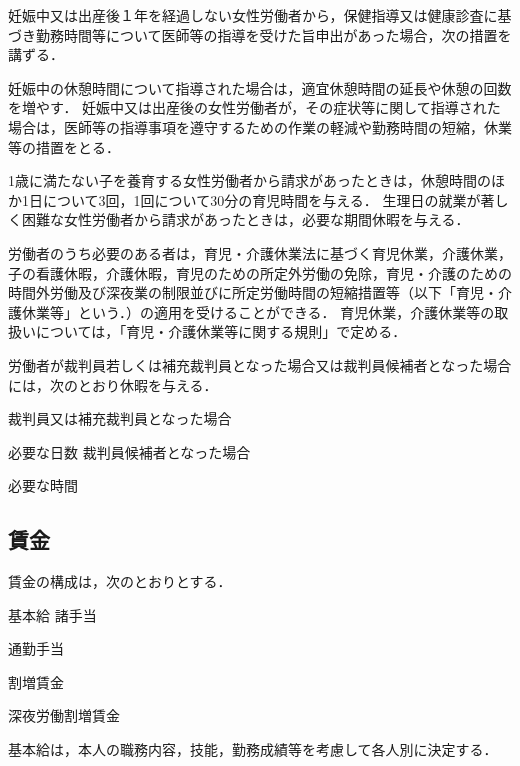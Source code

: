 \documentclass[11pt,a4paper]{jsarticle}
\begin{document}
\term
妊娠中又は出産後１年を経過しない女性労働者から，保健指導又は健康診査に基づき勤務時間等について医師等の指導を受けた旨申出があった場合，次の措置を講ずる．
\begin{enumerate}
	\itm 妊娠中の休憩時間について指導された場合は，適宜休憩時間の延長や休憩の回数を増やす．
	\itm 妊娠中又は出産後の女性労働者が，その症状等に関して指導された場合は，医師等の指導事項を遵守するための作業の軽減や勤務時間の短縮，休業等の措置をとる．
\end{enumerate}

1歳に満たない子を養育する女性労働者から請求があったときは，休憩時間のほか1日について3回，1回について30分の育児時間を与える．
\term
生理日の就業が著しく困難な女性労働者から請求があったときは，必要な期間休暇を与える．

労働者のうち必要のある者は，育児・介護休業法に基づく育児休業，介護休業，子の看護休暇，介護休暇，育児のための所定外労働の免除，育児・介護のための時間外労働及び深夜業の制限並びに所定労働時間の短縮措置等（以下「育児・介護休業等」という．）の適用を受けることができる．
\term
育児休業，介護休業等の取扱いについては，「育児・介護休業等に関する規則」で定める．

労働者が裁判員若しくは補充裁判員となった場合又は裁判員候補者となった場合には，次のとおり休暇を与える．
\begin{enumerate}
	\itm 裁判員又は補充裁判員となった場合 \par 必要な日数
	\itm 裁判員候補者となった場合\par 必要な時間
\end{enumerate}


\subsection{賃金}

賃金の構成は，次のとおりとする．
\begin{enumerate}
	\itm 基本給
	\itm 諸手当
	\begin{enumerate}
		\itm 通勤手当
	\end{enumerate}
	\itm 割増賃金
	\begin{enumerate}
		\itm 深夜労働割増賃金
	\end{enumerate}
\end{enumerate}

基本給は，本人の職務内容，技能，勤務成績等を考慮して各人別に決定する．
\end{document}

